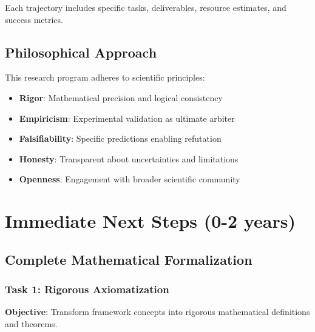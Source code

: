 Each trajectory includes specific tasks, deliverables, resource estimates, and success metrics.

\subsection{Philosophical Approach}

This research program adheres to scientific principles:
\begin{itemize}
    \item \textbf{Rigor}: Mathematical precision and logical consistency
    \item \textbf{Empiricism}: Experimental validation as ultimate arbiter
    \item \textbf{Falsifiability}: Specific predictions enabling refutation
    \item \textbf{Honesty}: Transparent about uncertainties and limitations
    \item \textbf{Openness}: Engagement with broader scientific community
\end{itemize}

\section{Immediate Next Steps (0-2 years)}

\subsection{Complete Mathematical Formalization}

\subsubsection{Task 1: Rigorous Axiomatization}

\textbf{Objective}: Transform framework concepts into rigorous mathematical definitions and theorems.

